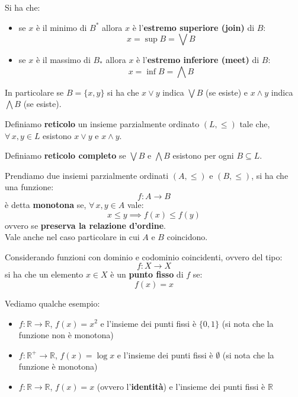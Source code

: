 \begin{definizione}
  Si ha che:
  \begin{itemize}
    \item se $x$ è il minimo di $B^*$ allora $x$ è l'\textbf{estremo superiore
      (join)} di $B$:
    \[x=\sup B=\bigvee B\]
    \item se $x$ è il massimo di $B_*$ allora $x$ è l'\textbf{estremo inferiore
      (meet)} di $B$:
    \[x=\inf B=\bigwedge B\]
  \end{itemize}
  In particolare se $B=\{x, y\}$ si ha che $x\lor y$ indica $\bigvee B$ (se
  esiste) e $x\land y$ indica $\bigwedge B$ (se esiste).
\end{definizione}
\begin{definizione}
  Definiamo \textbf{reticolo} un insieme parzialmente ordinato $(L,\leq)$ tale
  che, $\forall\, x, y\in L$ esistono $x\lor y$ e $x\land y$.
\end{definizione}
\begin{definizione} 
  Definiamo \textbf{reticolo completo} se $\bigvee B$ e $\bigwedge B$ esistono
  per ogni $B\subseteq L$.
\end{definizione}
\begin{definizione}
  Prendiamo due insiemi parzialmente ordinati $(A,\leq)$ e $(B,\leq)$, si ha che
  una funzione:
  \[f:A\to B\]
  è detta \textbf{monotona} se, $\forall\, x, y\in A$ vale:
  \[x\leq y\implies f(x)\leq f(y)\]
  ovvero se \textbf{preserva la relazione d'ordine}.\\
  Vale anche nel caso particolare in cui $A$ e $B$ coincidono.
\end{definizione}
\begin{definizione}
  Considerando funzioni con dominio e codominio coincidenti, ovvero del tipo:
  \[f:X\to X\]
  si ha che un elemento $x\in X$ è un \textbf{punto fisso} di $f$ se:
  \[f(x)=x\]
\end{definizione}
\begin{esempio}
  Vediamo qualche esempio:
  \begin{itemize}
    \item $f:\mathbb{R}\to\mathbb{R}$, $f(x)=x^2$ e l'insieme dei punti fissi è
    $\{0, 1\}$ (si nota che la funzione non è monotona)
    \item $f:\mathbb{R}^+\to\mathbb{R}$, $f(x)=\log x$ e l'insieme dei punti
    fissi è $\emptyset$ (si nota che la funzione è monotona)
    \item $f:\mathbb{R}\to\mathbb{R}$, $f(x)=x$ (ovvero l'\textbf{identità}) e
    l'insieme dei punti fissi è $\mathbb{R}$ 
  \end{itemize}
\end{esempio}
